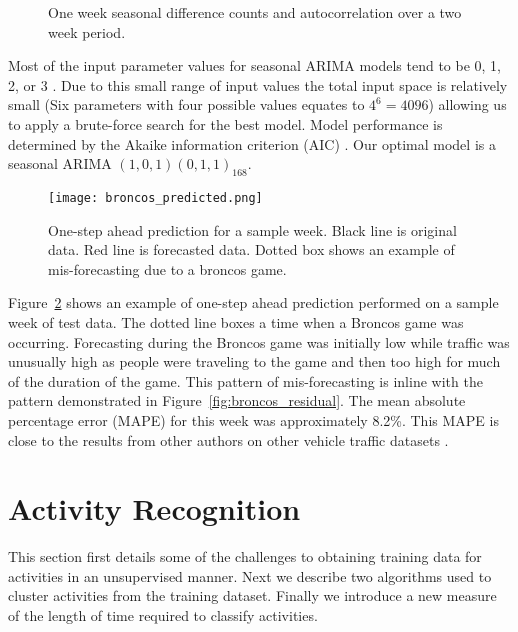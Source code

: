 \begin{figure}[t]
\begin{center}
\end{center}
\caption{One week seasonal difference counts and autocorrelation over a two week period.}
\label{fig:lag_data}
\end{figure}

Most of the input parameter values for seasonal ARIMA models tend to be 0, 1, 2, or 3 \cite{Box2008}.  Due to this small range of input values the total input space is relatively small (Six parameters with four possible values equates to $4^6 = 4096$) allowing us to apply a brute-force search for the best model.  Model performance is determined by the Akaike information criterion (AIC) \cite{akaike1974}.  Our optimal model is a seasonal ARIMA $(1,0,1)(0,1,1)_{168}$.  

\begin{figure}[h]
\begin{center}
\texttt{[image: broncos\_predicted.png]}
\end{center}
\caption{One-step ahead prediction for a sample week.  Black line is original data.  Red line is forecasted data.  Dotted box shows an example of mis-forecasting due to a broncos game.}
\label{fig:arima_prediction}
\end{figure}

Figure~\ref{fig:arima_prediction} shows an example of one-step ahead prediction performed on a sample week of test data.  The dotted line boxes a time when a Broncos game was occurring.  Forecasting during the Broncos game was initially low while traffic was unusually high as people were traveling to the game and then too high for much of the duration of the game.  This pattern of mis-forecasting is inline with the pattern demonstrated in Figure~\ref{fig:broncos_residual}.  The mean absolute percentage error (MAPE) for this week was approximately 8.2\%.  This MAPE is close to the results from other authors on other vehicle traffic datasets \cite{Williams2003,Smith1997}.  

\section{Activity Recognition}
This section first details some of the challenges to obtaining training data for activities in an unsupervised manner.  Next we describe two algorithms used to cluster activities from the training dataset.  Finally we introduce a new measure of the length of time required to classify activities.

